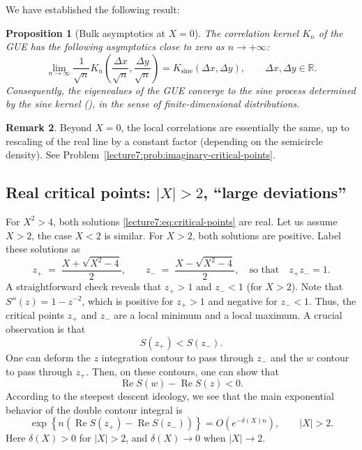 \documentclass[letterpaper,11pt,oneside,reqno]{book}
\numberwithin{equation}{chapter}  %
\newtheorem{proposition}{Proposition}[chapter]  %
\theoremstyle{definition}
\newtheorem{remark}[proposition]{Remark}
\begin{document}
We have established the following result:
\begin{proposition}[Bulk asymptotics at $X=0$]
	\label{lecture7:prop:bulk}
	The correlation kernel $K_n$ of the GUE has the following asymptotics
	close to zero as $n\to+\infty$:
	\begin{equation*}
		\lim_{n\to \infty}
		\frac{1}{\sqrt n}
		K_n\left( \frac{\Delta x}{\sqrt n},\frac{\Delta y}{\sqrt n} \right)
		=
		K_{\mathrm{sine}}\left( \Delta x,\Delta y \right),
		\qquad \Delta x,\Delta y\in\mathbb{R}.
	\end{equation*}
	Consequently, the eigenvalues of the GUE converge to the sine process
	determined by the sine kernel (),
	in the sense of finite-dimensional distributions.
\end{proposition}

\begin{remark}
	Beyond $X=0$, the local correlations are essentially the same,
	up to rescaling of the real line by a constant factor (depending
	on the semicircle density).
	See Problem~\ref{lecture7:prob:imaginary-critical-points}.
\end{remark}

\subsection{Real critical points: $|X|>2$, ``large deviations''}
\label{lecture7:sub:real-critical-points}

For \(X^2>4\), both solutions
\eqref{lecture7:eq:critical-points}
are real. Let us assume $X>2$, the case \(X<2\) is similar.
For $X>2$, both solutions are positive.
Label these solutions as
\[
	z_+ \;=\;\frac{X + \sqrt{X^2-4}}{2},
	\qquad
	z_- \;=\;\frac{X - \sqrt{X^2-4}}{2},
	\quad
	\text{so that}\quad z_+z_-=1.
\]
A straightforward check reveals that \(z_+\!>\!1\) and \(z_-\!<\!1\) (for \(X>2\)).
Note that $S''(z)=1-z^{-2}$, which is positive for \(z_+>1\) and negative for \(z_-<1\).  Thus, the critical points \(z_+\) and \(z_-\) are a local minimum and a local maximum.
A crucial observation is that
\begin{equation*}
	S(z_+)<S(z_-).
\end{equation*}
One can deform the $z$ integration contour to pass through
$z_-$ and the $w$ contour to pass through $z_+$.
Then, on these contours, one can show that
\begin{equation*}
	\operatorname{Re}S(w)-\operatorname{Re}S(z)<0.
\end{equation*}
According to the steepest descent ideology,
we see that the main exponential behavior of the double contour integral is
\begin{equation}
	\label{lecture7:eq:Oexp}
	\exp\left\{ n\left(
		\operatorname{Re}S(z_+)-\operatorname{Re}S(z_-)
\right) \right\}=O( e^{-\delta(X)n} ), \qquad |X|>2.
\end{equation}
Here $\delta(X)>0$ for $|X|>2$, and $\delta(X)\to0$ when $|X|\to2$.
\end{document}

